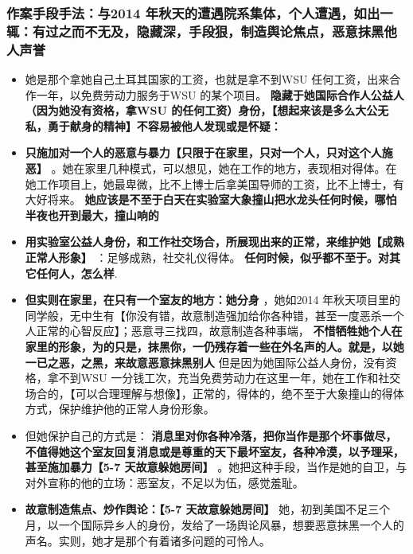 \documentclass[9pt, b5paper]{article}
\begin{document}
\subsubsection{作案手段手法：与2014 年秋天的遭遇院系集体，个人遭遇，如出一辄：有过之而不无及，隐藏深，手段狠，制造舆论焦点，恶意抹黑他人声誉}
\label{sec-3-2-1}
\begin{itemize}
\item 她是那个拿她自己土耳其国家的工资，也就是拿不到WSU 任何工资，出来合作一年，以免费劳动力服务于WSU 的某个项目。 \textbf{隐藏于她国际合作人公益人（因为她没有资格，拿WSU 的任何工资）身份，【想起来该是多么大公无私，勇于献身的精神】不容易被他人发现或是怀疑：}
\item \textbf{只施加对一个人的恶意与暴力【只限于在家里，只对一个人，只对这个人施恶】} 。她在家里几种模式，可以想见，她在工作的地方，表现相对得体。在她工作项目上，她最卑微，比不上博士后拿美国导师的工资，比不上博士，有大好将来。 \textbf{她应该是不至于白天在实验室大象撞山把水龙头任何时候，哪怕半夜也开到最大，撞山响的}
\item \textbf{用实验室公益人身份，和工作社交场合，所展现出来的正常，来维护她【成熟正常人形象】} ：足够成熟，社交礼仪得体。 \textbf{任何时候，似乎都不至于。对其它任何人，怎么样}.
\item \textbf{但实则在家里，在只有一个室友的地方：她分身} ，她如2014 年秋天项目里的同学般，无中生有【你没有错，故意制造强加给你各种错，甚至一度恶杀一个人正常的心智反应】；恶意寻三找四，故意制造各种事端， \textbf{不惜牺牲她个人在家里的形象，为的只是，抹黑你，一仍残存着一些在外名声的人。就是，以她一已之恶，之黑，来故意恶意抹黑别人} 但是因为她国际公益人身份，没有资格，拿不到WSU 一分钱工次，充当免费劳动力在这里一年，她在工作和社交场合的，【可以合理理解与想像】，正常的，得体的，绝不至于大象撞山的得体方式，保护维护他的正常人身份形象。
\item 但她保护自己的方式是： \textbf{消息里对你各种冷落，把你当作是那个坏事做尽，不值得她这个室友回复消息或是尊重的天下最坏室友，各种冷漠，以予理采，甚至施加暴力【5-7 天故意躲她房间】} 。她把这种手段，当作是她的自卫，与对外宣称的他的立场：恶室友，不足以为伍，感觉羞耻。
\item \textbf{故意制造焦点、炒作舆论：【5-7 天故意躲她房间】} 她，初到美国不足三个月，以一个国际异乡人的身份，发给了一场舆论风暴，想要恶意抹黑一个人的声名。实则，她才是那个有着诸多问题的可怜人。
\end{itemize}
\end{document}
